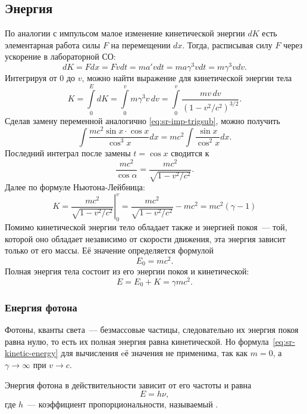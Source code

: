 \subsection{Энергия}
По аналогии с импульсом малое изменение кинетической энергии $dK$ есть элементарная работа силы $F$ на перемещении $dx$. Тогда, расписывая силу $F$ через ускорение в лабораторной СО:
\begin{equation*}
	dK = F dx = F v dt = m a' v dt = m a \gamma^{3} v dt = m \gamma^{3} v dv.
\end{equation*}
Интегрируя от 0 до $v$, можно найти выражение для кинетической энергии тела
\begin{equation*}
	K 
	   = \int\limits_0^{E} dK 
	   = \int\limits_0^{v} m \gamma^{3}v \, dv
	   = \int\limits_0^{v} \frac{m v \, dv}{\left(1 - v^2 / c^2\right)^{3/2}}.
\end{equation*}
Сделав замену переменной аналогично \eqref{eq:sr-imp-trigsub}, можно получить
\begin{equation*}
	\int \frac{m c^2 \sin x \cdot \cos x}{\cos ^{3} x} d x=m c^2 \int \frac{\sin x}{\cos ^2 x} d x.
\end{equation*}
Последний интеграл после замены $t = \cos x$ сводится к
\begin{equation*}
	\frac{m c^2}{\cos \alpha}=\frac{m c^2}{\sqrt{1-v^2 / c^2}}.
\end{equation*}
Далее по формуле Ньютона-Лейбница:
\begin{equation}
    K 
        = \left. \frac{m c^2}{\sqrt{1 - v^2 / c^2}} \right|_0^v 
        = \frac{m c^2}{\sqrt{1-v^2 / c^2}} - m c^2 
        = m c^2 (\gamma - 1)
    \label{eq:sr-kinetic-energy}
\end{equation}
Помимо кинетической энергии тело обладает также и энергией покоя~--- той, которой оно обладает независимо от скорости движения, эта энергия зависит только от его массы. Её значение определяется формулой
\begin{equation}
	E_0 = m c^2.
\end{equation}
Полная энергия тела состоит из его энергии покоя и кинетической:
\begin{equation}
	E = E_0 + K = \gamma m c^2.
\end{equation}

\subsubsection*{Енергия фотона}
Фотоны, кванты света~--- безмассовые частицы, следовательно их энергия покоя равна нулю, то есть их полная энергия равна кинетической. Но формула~\eqref{eq:sr-kinetic-energy} для вычисления eё значения не применима, так как $m = 0$, а~$\gamma \rightarrow \infty$ при $v \rightarrow c$. 

Энергия фотона в действительности зависит от его частоты и равна
\begin{equation}
    E = h \nu,
\end{equation}
где $h$~--- коэффициент пропорциональности, называемый .

